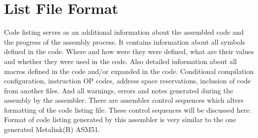         \section{List File Format}
                Code listing serves as an additional information about the assembled code and the progress of the assembly process. It contains information about all symbols defined in the code. Where and how were they were defined, what are their values and whether they were used in the code. Also detailed information about all macros defined in the code and/or expanded in the code. Conditional compilation configuration, instruction OP codes, address space reservations, inclusion of code from another files. And all warnings, errors and notes generated during the assembly by the assembler. There are assembler control sequences which alters formatting of the code listing file. These control sequences will be discussed here. Format of code listing generated by this assembler is very similar to the one generated Metalink(R) ASM51.
